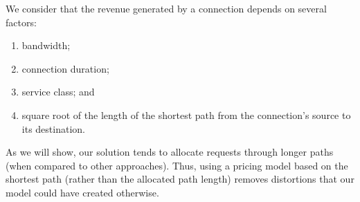 \documentclass[journal]{IEEEtran}
\begin{document}
We consider that the revenue generated by a connection depends on several factors:
\begin{enumerate}
\item bandwidth;
\item connection duration;
\item service class; and
\item square root of the length of the shortest path from the connection's source to its destination.
\end{enumerate}
As we will show, our solution tends to allocate requests through longer paths (when compared to other approaches). Thus, using a pricing model based on the shortest path (rather than the allocated path length) removes distortions that our model could have created otherwise. %
\end{document}

